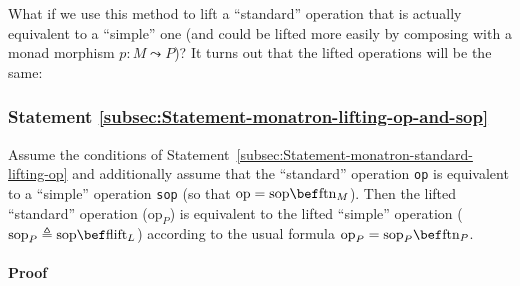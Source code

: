 What if we use this method to lift a \textsf{``}standard\textsf{''} operation that
is actually equivalent to a \textsf{``}simple\textsf{''} one (and could be lifted
more easily by composing with a monad morphism $p:M\leadsto P$)?
It turns out that the lifted operations will be the same:

\subsubsection{Statement \label{subsec:Statement-monatron-lifting-op-and-sop}\ref{subsec:Statement-monatron-lifting-op-and-sop}}

Assume the conditions of Statement~\ref{subsec:Statement-monatron-standard-lifting-op}
and additionally assume that the \textsf{``}standard\textsf{''} operation \lstinline!op!
is equivalent to a \textsf{``}simple\textsf{''} operation \lstinline!sop! (so that
$\text{op}=\text{sop}\bef\text{ftn}_{M}$). Then the lifted \textsf{``}standard\textsf{''}
operation ($\text{op}_{P}$) is equivalent to the lifted \textsf{``}simple\textsf{''}
operation ($\text{sop}_{P}\triangleq\text{sop}\bef\text{flift}_{L}$)
according to the usual formula $\text{op}_{P}=\text{sop}_{P}\bef\text{ftn}_{P}$.

\paragraph{Proof}

